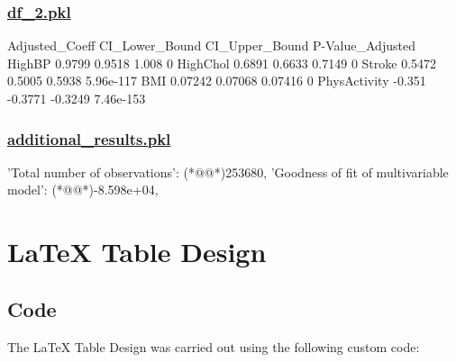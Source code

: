 \documentclass[11pt]{article}
\begin{document}
\subsubsection*{\hyperlink{code-Data Analysis-df-2-pkl}{df\_2.pkl}}

\begin{codeoutput}
             Adjusted\_Coeff CI\_Lower\_Bound CI\_Upper\_Bound P-Value\_Adjusted
HighBP               0.9799         0.9518          1.008                0
HighChol             0.6891         0.6633         0.7149                0
Stroke               0.5472         0.5005         0.5938        5.96e-117
BMI                 0.07242        0.07068        0.07416                0
PhysActivity         -0.351        -0.3771        -0.3249        7.46e-153
\end{codeoutput}\hypertarget{file-additional-results-pkl}{}

\subsubsection*{\hyperlink{code-Data Analysis-additional-results-pkl}{additional\_results.pkl}}

\begin{codeoutput}
{
    'Total number of observations': (*@@*)253680,
    'Goodness of fit of multivariable model': (*@@*)-8.598e+04,
}
\end{codeoutput}

\section{LaTeX Table Design}
\subsection{{Code}}
The LaTeX Table Design was carried out using the following custom code:
\end{document}
